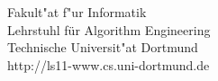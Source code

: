 \begin{titlepage}
\vspace*{2.5cm}
\hspace*{\links}
\begin{minipage}[b]{8cm}
\normalsize
\raggedright
Fakult"at f"ur Informatik\\
Lehrstuhl für Algorithm Engineering\\
Technische Universit"at Dortmund \\
http://ls11-www.cs.uni-dortmund.de
\end{minipage}

\end{titlepage}
